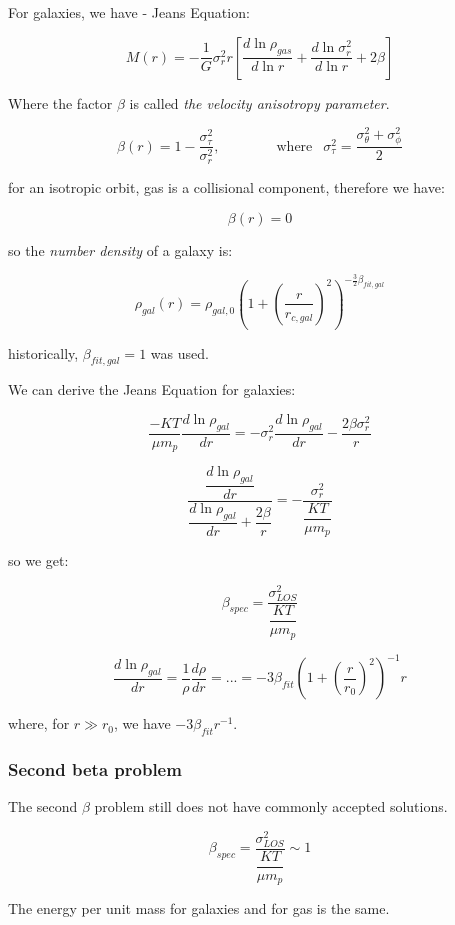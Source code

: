 For galaxies, we have - Jeans Equation:

$$
M(r) = - \dfrac 1{G} \sigma_r^2 r \left[ \dfrac{d \ln \rho_{gas}}{d \ln r} + \dfrac{d \ln \sigma_r^2}{d \ln r} + 2 \beta \right]
$$

Where the factor $\beta$ is called \textit{the velocity anisotropy parameter}.

$$
\beta(r) = 1 - \dfrac{\sigma_{\tau}^2}{\sigma_r^2}, 
\qquad \qquad \text{where } \ \ 
\sigma_{\tau}^2 = \dfrac {\sigma_{\theta}^2 + \sigma_{\phi}^2}2
$$

for an isotropic orbit, gas is a collisional component, therefore we have:

$$
\boxed{\beta(r) = 0}
$$

so the \textit{number density} of a galaxy is:

$$
\rho_{gal}(r) = \rho_{gal, 0} \left( 1 + \left( \dfrac{r}{r_{c, gal}} \right)^2 \right)^{-\frac{3}{2} \beta_{fit, gal}}
$$

historically, $\beta_{fit, gal} = 1$ was used.


We can derive the Jeans Equation for galaxies:

$$
\dfrac{-KT}{\mu m_p} \dfrac{d \ln \rho_{gal}}{d r} = - \sigma_r^2 \dfrac{d \ln \rho_{gal}}{d r} - \dfrac{2 \beta \sigma_r^2}{r}
$$

$$
\dfrac{\dfrac{d \ln \rho_{gal}}{d r}}{\dfrac{d \ln \rho_{gal}}{d r} + \dfrac{2 \beta}{r}} = - \dfrac{\sigma_r^2}{\dfrac{KT}{\mu m_p}}
$$

so we get:

$$
\beta_{spec} = \dfrac{\sigma_{LOS}^2}{\dfrac{KT}{\mu m_p}}
$$

$$
\dfrac{d \ln \rho_{gal}}{d r} = \dfrac 1\rho \dfrac{d \rho}{dr} = ... = - 3 \beta_{fit} \left( 1 + \left(\dfrac{r}{r_0} \right)^2 \right)^{-1}r
$$

where, for $r \gg r_0$, we have $- 3 \beta_{fit} r^{-1}$.


\subsubsection{Second beta problem}

The second $\beta$ problem still does not have commonly accepted solutions.

$$
\beta_{spec} = \dfrac{\sigma_{LOS}^2}{\dfrac{KT}{\mu m_p}} \sim 1
$$

The energy per unit mass for galaxies and for gas is the same.

